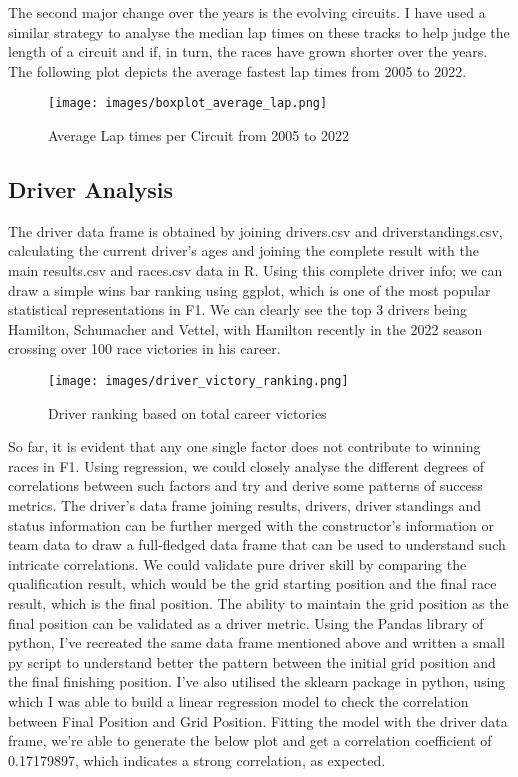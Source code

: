 \documentclass[10pt,twocolumn,letterpaper]{article}
\begin{document}
The second major change over the years is the evolving circuits. I have used a similar strategy to analyse the median lap times on these tracks to help judge the length of a circuit and if, in turn, the races have grown shorter over the years. The following plot depicts the average fastest lap times from 2005 to 2022. 

\begin{figure}[h]
\centering
\texttt{[image: images/boxplot\_average\_lap.png]} 
\caption{Average Lap times per Circuit from 2005 to 2022}
\end{figure}

\subsection{Driver Analysis}

The driver data frame is obtained by joining drivers.csv and driverstandings.csv, calculating the current driver's ages and joining the complete result with the main results.csv and races.csv data in R. Using this complete driver info; we can draw a simple wins bar ranking using ggplot, which is one of the most popular statistical representations in F1. We can clearly see the top 3 drivers being Hamilton, Schumacher and Vettel, with Hamilton recently in the 2022 season crossing over 100 race victories in his career. 

\begin{figure}[h]
\centering
\texttt{[image: images/driver\_victory\_ranking.png]} 
\caption{Driver ranking based on total career victories}
\end{figure}

So far, it is evident that any one single factor does not contribute to winning races in F1. Using regression, we could closely analyse the different degrees of correlations between such factors and try and derive some patterns of success metrics. The driver's data frame joining results, drivers, driver standings and status information can be further merged with the constructor's information or team data to draw a full-fledged data frame that can be used to understand such intricate correlations. We could validate pure driver skill by comparing the qualification result, which would be the grid starting position and the final race result, which is the final position. The ability to maintain the grid position as the final position can be validated as a driver metric. Using the Pandas library of python, I've recreated the same data frame mentioned above and written a small py script to understand better the pattern between the initial grid position and the final finishing position. I've also utilised the sklearn package in python, using which I was able to build a linear regression model to check the correlation between Final Position and Grid Position. Fitting the model with the driver data frame, we're able to generate the below plot and get a correlation coefficient of 0.17179897, which indicates a strong correlation, as expected.
\end{document}
